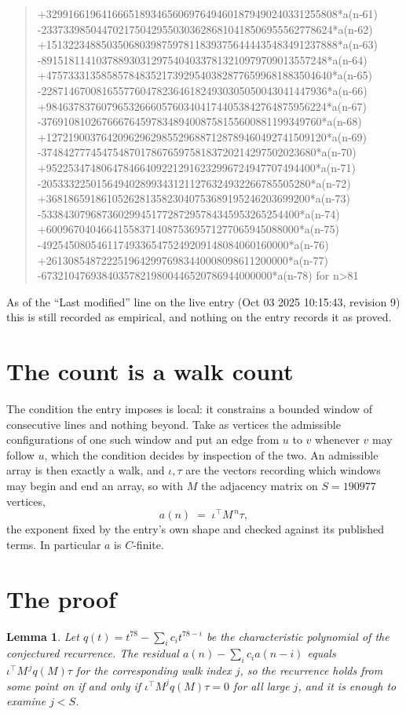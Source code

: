 \documentclass[11pt,a4paper]{article}
\theoremstyle{plain}
\newtheorem{lemma}[theorem]{Lemma}
\theoremstyle{definition}
\begin{document}
\begin{quote}
+32991661964166651893465606976494601879490240331255808*a(n-61) -23373398504470217504295503036286810418506955562778624*a(n-62) +15132234885035068039875978118393756444435483491237888*a(n-63) -8915181141037889303129754040337813210979709013557248*a(n-64) +4757333135858578483521739295403828776599681883504640*a(n-65) -2287146700816557760478236461824930305050043041447936*a(n-66) +984637837607965326660576034041744053842764875956224*a(n-67) -376910810267666764597834894008758155600881199349760*a(n-68) +127219003764209629629855296887128789460492741509120*a(n-69) -37484277745475487017867659758183720214297502023680*a(n-70) +9522534748064784664092212916232996724947707494400*a(n-71) -2053332250156494028993431211276324932266785505280*a(n-72) +368186591861052628135823040753689195246203699200*a(n-73) -53384307968736029945177287295784345953265254400*a(n-74) +6009670404664155837140875369571277065945088000*a(n-75) -492545080546117493365475249209148084060160000*a(n-76) +26130854872225196429976983440008098611200000*a(n-77) -673210476938403578219800446520786944000000*a(n-78) for n>81
\end{quote}
As of the ``Last modified'' line on the live entry (Oct 03 2025 10:15:43, revision 9) this is still
recorded as empirical, and nothing on the entry records it as proved.

\section{The count is a walk count}

The condition the entry imposes is local: it constrains a bounded window of consecutive lines and nothing beyond. Take as vertices the admissible configurations of one such window and put an edge from $u$ to $v$ whenever $v$ may follow $u$, which the condition decides by inspection of the two.
An admissible array is then exactly a walk, and $\iota,\tau$ are the vectors recording which windows may begin and end an array, so with $M$ the adjacency matrix on $S=190977$ vertices,
\[
a(n)\;=\;\iota^{\!\top}M^{\,n}\tau ,
\]
the exponent fixed by the entry's own shape and checked against its published terms. In
particular $a$ is $C$-finite.

\section{The proof}

\begin{lemma}\label{lem:crit}
Let $q(t)=t^{78}-\sum_i c_it^{78-i}$ be the characteristic polynomial of the
conjectured recurrence. The residual $a(n)-\sum_ic_ia(n-i)$ equals
$\iota^{\!\top}M^{\,j}q(M)\tau$ for the corresponding walk index $j$, so the recurrence
holds from some point on if and only if $\iota^{\!\top}M^{j}q(M)\tau=0$ for all large $j$,
and it is enough to examine $j<S$.
\end{lemma}
\end{document}
